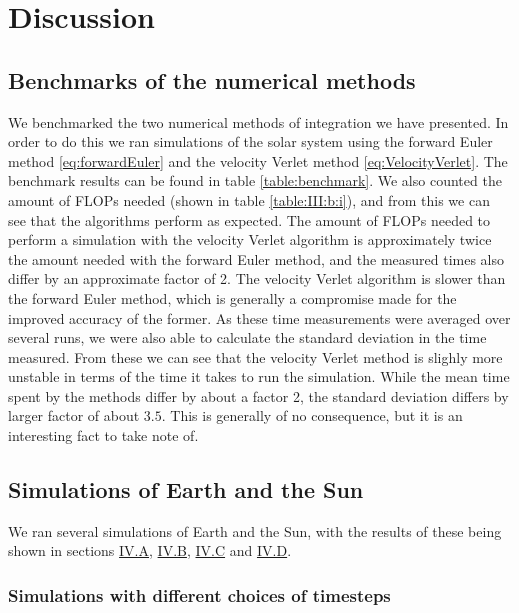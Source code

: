 \documentclass[reprint,english,notitlepage]{revtex4-1}  %
\begin{document}
\newpage







\section{Discussion} \label{sec:V}

\subsection{Benchmarks of the numerical methods} \label{sec:V:a}

We benchmarked the two numerical methods of integration we have presented. In order to do this we ran simulations of the solar system using the forward Euler method \eqref{eq:forwardEuler} and the velocity Verlet method \eqref{eq:VelocityVerlet}. The benchmark results can be found in table \ref{table:benchmark}. We also counted the amount of FLOPs needed (shown in table \ref{table:III:b:i}), and from this we can see that the algorithms perform as expected. The amount of FLOPs needed to perform a simulation with the velocity Verlet algorithm is approximately twice the amount needed with the forward Euler method, and the measured times also differ by an approximate factor of 2. The velocity Verlet algorithm is slower than the forward Euler method, which is generally a compromise made for the improved accuracy of the former. As these time measurements were averaged over several runs, we were also able to calculate the standard deviation in the time measured. From these we can see that the velocity Verlet method is slighly more unstable in terms of the time it takes to run the simulation. While the mean time spent by the methods differ by about a factor 2, the standard deviation differs by larger factor of about $3.5$. This is generally of no consequence, but it is an interesting fact to take note of.


\subsection{Simulations of Earth and the Sun} \label{sev:V:b}

We ran several simulations of Earth and the Sun, with the results of these being shown in sections \hyperref[sec:IV:a]{IV.A}, \hyperref[sec:IV:b]{IV.B}, \hyperref[sec:IV:c]{IV.C} and \hyperref[sec:IV:d]{IV.D}.


\subsubsection{Simulations with different choices of timesteps} \label{sec:V:b:i}
\end{document}
